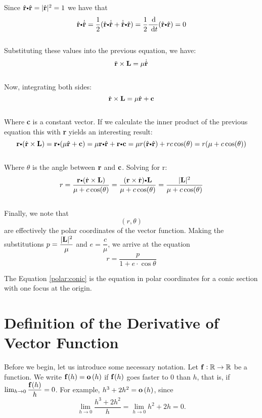 Since $\hat{\vector{r}}\bp\hat{\vector{r}} = |\hat{\vector{r}}|^2 = 1$ we have that
\[\hat{\vector{r}}\bp\dot{\hat{\vector{r}}} = \dfrac{1}{2}(\hat{\vector{r}}\bp\dot{\hat{\vector{r}}} + 
\dot{\hat{\vector{r}}}\bp\hat{\vector{r}}) = 
\dfrac{1}{2}\dfrac{\d}{\dt}(\hat{\vector{r}}\bp\hat{\vector{r}}) = 0\]\\
Substituting these values into the previous equation, we have:\\
\[\ddot{\mathbf{ r}}\times\bold{L}=\mu\dot{\hat{\mathbf{ r}}}\]\\
Now, integrating both sides:\\
\[\dot{\mathbf{ r}}\times\bold{L}=\mu\hat{\mathbf{ r}} + \bold{c}\]\\
Where \textbf{c} is a constant vector. If we calculate the inner product of  the previous equation  this with \textbf{r}
yields an interesting result:\\
\[\vector{r}\bp(\dot{\vector{r}}\times\bold{L})=\vector{r}\bp(\mu\hat{\vector{r}} + 
\bold{c}) = \mu\vector{r}\bp\hat{\vector{r}} + \vector{r}\bp\bold{c} = \mu 
r(\hat{\vector{r}}\bp\hat{\vector{r}})+rc\cos(\theta)=r(\mu + c\cos(\theta))\]\\
Where $\theta$ is the angle between $\mathbf{ r}$ and $\bold{c}$.
Solving for r:\\
\[r = \dfrac{\vector{r}\bp(\dot{\vector{r}}\times\bold{L})}{\mu + c\cos(\theta)} 
= \dfrac{(\vector{r}\times\dot{\vector{r}})\bp\bold{L}}{\mu + c\cos(\theta)} = 
\dfrac{|\bold{L}|^2}{\mu + c\cos(\theta)}\]\\
Finally, we note  that \[(r,\theta)\] are effectively the polar coordinates of the
vector function. Making the substitutions $p=\dfrac{|\bold{L}|^2}{\mu}$
and $e=\dfrac{c}{\mu}$, we  arrive at the equation
\begin{equation}
 r = \dfrac {p}{1 + e \cdot \cos \theta} \label{polar:conic}
\end{equation}



The Equation \ref{polar:conic}  is the equation in polar coordinates for a
conic section with  one focus at the origin. 


\section{Definition of the Derivative of Vector Function}
Before we begin, let us introduce some necessary notation. Let
$\mathbf{ f}:\mathbb{R}\rightarrow \mathbb{R}$ be a function. We write
$\mathbf{ f}(h)={\mathbf o}\left(h\right)$ if $\mathbf{ f}(h)$ goes faster to $0$ than $h$, that
is, if $\lim _{h\to 0} \dfrac{\mathbf{ f}(h)}{h}=0$. For example, $h^3+2h^2 =
{\mathbf o}\left(h\right)$, since
$$\lim _{h\to 0}\dfrac{h^3+2h^2}{h} = \lim_{h\to 0} h^2+2h=0.$$

